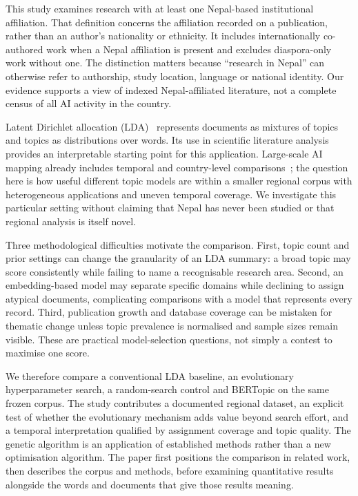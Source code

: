 This study examines research with at least one Nepal-based institutional affiliation. That
definition concerns the affiliation recorded on a publication, rather than an author's
nationality or ethnicity. It includes internationally co-authored work when a Nepal affiliation
is present and excludes diaspora-only work without one. The distinction matters because
``research in Nepal'' can otherwise refer to authorship, study location, language or national
identity. Our evidence supports a view of indexed Nepal-affiliated literature, not a complete
census of all AI activity in the country.

Latent Dirichlet allocation (LDA)~\cite{blei2003} represents documents as mixtures of topics and
topics as distributions over words. Its use in scientific literature analysis~\cite{griffiths2004}
provides an interpretable starting point for this application. Large-scale AI mapping already
includes temporal and country-level comparisons~\cite{yu2023}; the question here is how useful
different topic models are within a smaller regional corpus with heterogeneous applications and
uneven temporal coverage. We investigate this particular setting without claiming that Nepal
has never been studied or that regional analysis is itself novel.

Three methodological difficulties motivate the comparison. First, topic count and prior settings
can change the granularity of an LDA summary: a broad topic may score consistently while failing
to name a recognisable research area. Second, an embedding-based model may separate specific
domains while declining to assign atypical documents, complicating comparisons with a model
that represents every record. Third, publication growth and database coverage can be mistaken
for thematic change unless topic prevalence is normalised and sample sizes remain visible.
These are practical model-selection questions, not simply a contest to maximise one score.

We therefore compare a conventional LDA baseline, an evolutionary hyperparameter search,
a random-search control and BERTopic on the same frozen corpus. The study contributes a
documented regional dataset, an explicit test of whether the evolutionary mechanism adds value
beyond search effort, and a temporal interpretation qualified by assignment coverage and topic
quality. The genetic algorithm is an application of established methods rather than a new
optimisation algorithm. The paper first positions the comparison in related work, then describes
the corpus and methods, before examining quantitative results alongside the words and documents
that give those results meaning.

